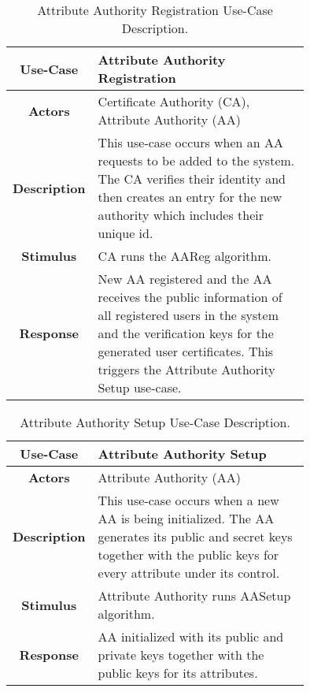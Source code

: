 \begin{table}[]
\centering
\begin{tabular}{|c|p{0.75\linewidth}|}
	\hline
	\textbf{Use-Case}    & Attribute Authority Registration                                   \\ \hline
	\textbf{Actors}      & Certificate Authority (CA), Attribute Authority (AA)                         \\ \hline
	\textbf{Description} & This use-case occurs when an AA requests to be added to the system. The CA verifies their identity and then creates an entry for the new authority which includes their unique id. \\ \hline
	\textbf{Stimulus}    & CA runs the AAReg algorithm.                   \\ \hline
	\textbf{Response}    & New AA registered and the AA receives the public information of all registered users in the system and the verification keys for the generated user certificates. This triggers the Attribute Authority Setup use-case.            \\ \hline
\end{tabular}
\caption{Attribute Authority Registration Use-Case Description.}
\label{tab:use_case_aareg}
\end{table}

\begin{table}[]
	\centering
	\begin{tabular}{|c|p{0.75\linewidth}|}
		\hline
		\textbf{Use-Case}    & Attribute Authority Setup                                   \\ \hline
		\textbf{Actors}      & Attribute Authority (AA)                         \\ \hline
		\textbf{Description} & This use-case occurs when a new AA is being initialized. The AA generates its public and secret keys together with the public keys for every attribute under its control.  \\ \hline
		\textbf{Stimulus}    & Attribute Authority runs AASetup algorithm.                    \\ \hline
		\textbf{Response}    & AA initialized with its public and private keys together with the public keys for its attributes.            \\ \hline
	\end{tabular}
	\caption{Attribute Authority Setup Use-Case Description.}
	\label{tab:use_case_aasetup}
\end{table}

